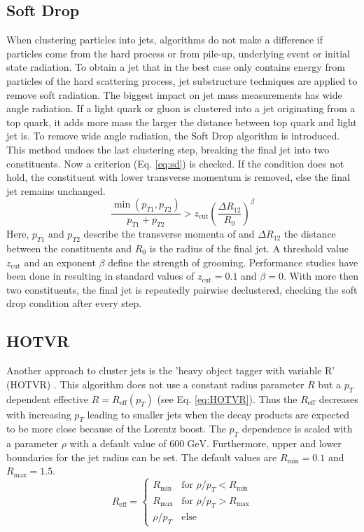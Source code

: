 \subsection{Soft Drop}
\label{sec:sd}
	When clustering particles into jets, algorithms do not make a difference if particles come from the hard process or from pile-up, underlying event or initial state radiation. To obtain a jet that in the best case only contains energy from particles of the hard scattering process, jet substructure techniques are applied to remove soft radiation. The biggest impact on jet mass measurements has wide angle radiation. If a light quark or gluon is clustered into a jet originating from a top quark, it adds more mass the larger the distance between top quark and light jet is. To remove wide angle radiation, the Soft Drop algorithm \cite{softdrop} is introduced. This method undoes the last clustering step, breaking the final jet into two constituents. Now a criterion (Eq. \ref{eq:sd}) is checked. If the condition does not hold, the constituent with lower transverse momentum is removed, else the final jet remains unchanged. 
	\begin{equation}
	\frac{\min(p_{T1}, p_{T2})}{p_{T1} + p_{T2}} > z_\text{cut} \left( \frac{\Delta R_{12}}{R_0}\right)^\beta
	\label{eq:sd}
	\end{equation}
	Here, $p_{T1}$ and $p_{T2}$ describe the transverse momenta of and $\Delta R_{12}$ the distance between the constituents and $R_0$ is the radius of the final jet. A threshold value $z_\text{cut}$ and an exponent $\beta$ define the strength of grooming. Performance studies have been done in \cite{softdropvalues} resulting in standard values of $z_\text{cut} = 0.1$ and $\beta =0$.	With more then two constituents, the final jet is repeatedly pairwise declustered, checking the soft drop condition after every step.
	
\subsection{HOTVR}
\label{sec:HOTVR}
	Another approach to cluster jets is the 'heavy object tagger with variable R' (HOTVR) \cite{hotvr}. This algorithm does not use a constant radius parameter $R$ but a $p_T$ dependent effective $R=R_\text{eff}(p_T)$ (see Eq. \ref{eq:HOTVR}). Thus the $R_\text{eff}$ decreases with increasing $p_T$ leading to smaller jets when the decay products are expected to be more close because of the Lorentz boost. The $p_T$ dependence is scaled with a parameter $\rho$ with a default value of $600\;\text{GeV}$. Furthermore, upper and lower boundaries for the jet radius can be set. The default values are $R_\text{min} = 0.1$ and $R_\text{max} = 1.5$. 	
	\begin{equation}
	\label{eq:HOTVR}
	  R_\text{eff} =
	   \begin{cases}
	     R_\text{min} & \text{for } \rho / p_T < R_\text{min} \\
	     R_\text{max} & \text{for } \rho / p_T > R_\text{max} \\
	     \rho / p_T & \text{else}  
	   \end{cases}
	\end{equation}
	
